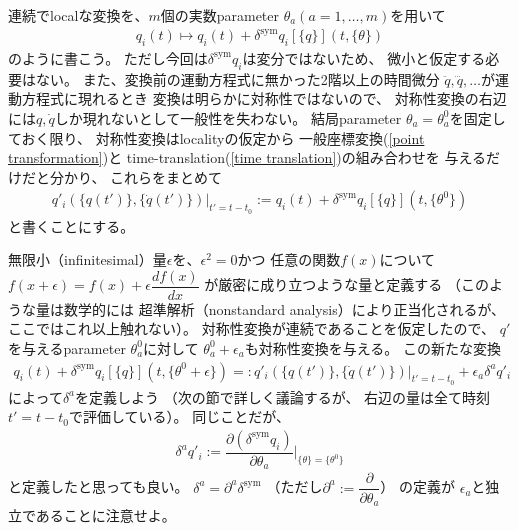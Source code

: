 連続でlocalな変換を、$m$個の実数parameter
$\theta_a (a=1,\dots,m)$を用いて
\begin{align}
  q_i(t) \mapsto q_i(t) +
  \delta^{\mathrm{sym}} q_i[\{ q \}] (t, \{\theta\})
\end{align}
のように書こう。
ただし今回は$\delta^{\mathrm{sym}} q_i$は変分ではないため、
微小と仮定する必要はない。
また、変換前の運動方程式に無かった2階以上の時間微分
$\ddot{q}, \dddot{q},\dots$が運動方程式に現れるとき
変換は明らかに対称性ではないので、
対称性変換の右辺には$q, \dot{q}$しか現れないとして一般性を失わない。
結局parameter $\theta_a = \theta_a^0$を固定しておく限り、
対称性変換はlocalityの仮定から
一般座標変換(\ref{point transformation})と
time-translation(\ref{time translation})の組み合わせを
与えるだけだと分かり、
これらをまとめて
\begin{align}
  q'_i( \{ q(t') \}, \{ \dot{q}(t') \} )
    \Big|_{t' = t - t_0}
  := q_i(t) +
  \delta^{\mathrm{sym}} q_i[\{ q \}] (t, \{\theta^0\})
\end{align}
と書くことにする。

無限小（infinitesimal）量$\epsilon$を、$\epsilon^2 = 0$かつ
任意の関数$f(x)$について
$f(x+\epsilon)=f(x) + \epsilon \dfrac{df(x)}{dx}$
が厳密に成り立つような量と定義する
（このような量は数学的には
超準解析（nonstandard analysis）により正当化されるが、
ここではこれ以上触れない）。
対称性変換が連続であることを仮定したので、
$q'$を与えるparameter $\theta_a^0$に対して
$\theta_a^0 + \epsilon_a$も対称性変換を与える。
この新たな変換
\begin{align}
  q_i(t) +
  \delta^{\mathrm{sym}} q_i[\{ q \}] (t, \{\theta^0 + \epsilon\})
  =:
  q'_i( \{ q(t') \}, \{ \dot{q}(t') \} )
    \Big|_{t' = t - t_0}
  + \epsilon_a \delta^a q'_i
\end{align}
によって$\delta^a$を定義しよう
（次の節で詳しく議論するが、
右辺の量は全て時刻$t' = t - t_0$で評価している）。
同じことだが、
\begin{align}
  \delta^a q'_i :=
  \dfrac{\partial
    (\delta^{\mathrm{sym}} q_i)
  }{
    \partial \theta_a
  }
  \Bigg|_{\{\theta\} = \{\theta^0\}}
\end{align}
と定義したと思っても良い。
$\delta^a = \partial^a \delta^{\mathrm{sym}}$
（ただし$\partial^a := \dfrac{\partial}{\partial \theta_a}$）
の定義が
$\epsilon_a$と独立であることに注意せよ。

